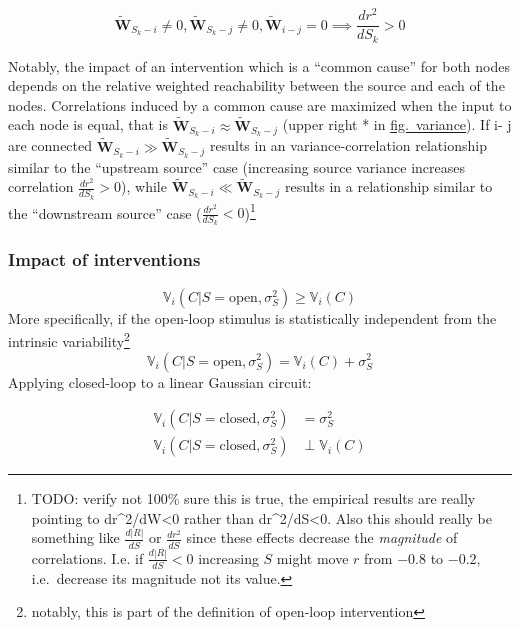 \documentclass{article}
\begin{document}
\[\mathbf{\widetilde{W}}_ {S_k -  i} \neq 0, \mathbf{\widetilde{W}}_ {S_k -  j} \neq 0, \mathbf{\widetilde{W}}_ {i -  j} = 0 \implies \frac{dr^2}{dS_k} > 0\]

Notably, the impact of an intervention which is a ``common cause'' for both nodes depends on the relative weighted reachability between the source and each of the nodes. Correlations induced by a common cause are maximized when the input to each node is equal, that is
\(\mathbf{\widetilde{W}}_{S_k- i} \approx \mathbf{\widetilde{W}}_{S_k- j}\)
(upper right * in \protect\hyperlink{fig-var}{fig.~variance}). If i- j are connected
\(\mathbf{\widetilde{W}}_{S_k- i} \gg \mathbf{\widetilde{W}}_{S_k- j}\)
results in an variance-correlation relationship similar to the
``upstream source'' case (increasing source variance increases correlation \(\frac{dr^2}{dS_k} > 0\)), while
\(\mathbf{\widetilde{W}}_{S_k- i} \ll \mathbf{\widetilde{W}}_{S_k- j}\)
results in a relationship similar to the ``downstream source'' case
(\(\frac{dr^2}{dS_k} < 0\))\footnote{TODO: verify not 100\% sure this is
  true, the empirical results are really pointing to
  dr\^{}2/dW\textless0 rather than dr\^{}2/dS\textless0. Also this
  should really be something like \(\frac{d|R|}{dS}\) or
  \(\frac{dr^2}{dS}\) since these effects decrease the \emph{magnitude}
  of correlations. I.e. if \(\frac{d|R|}{dS} < 0\) increasing \(S\)
  might move \(r\) from \(-0.8\) to \(-0.2\), i.e.~decrease its
  magnitude not its value.}

\hypertarget{sec:methods-intervention-var}{%
\subsubsection{Impact of interventions}\label{sec:methods-intervention-var}}

\[\mathbb{V}_{i}(C|S=\text{open},\sigma^2_S) \geq \mathbb{V}_{i}(C)\]
More specifically, if the open-loop stimulus is statistically independent from the intrinsic variability\footnote{notably, this is
  part of the definition of open-loop intervention}
\[\mathbb{V}_{i}(C|S=\text{open},\sigma^2_S) = \mathbb{V}_{i}(C) + \sigma^2_S\]
Applying closed-loop to a linear Gaussian circuit:

\[
\begin{aligned}
\mathbb{V}_{i}(C|S=\text{closed},\sigma^2_S) &= \sigma^2_S  \\
\mathbb{V}_{i}(C|S=\text{closed},\sigma^2_S) &\perp \mathbb{V}_{i}(C)
\end{aligned}
\]
\end{document}

